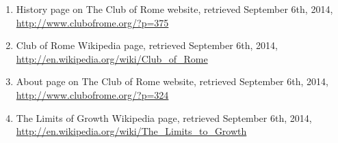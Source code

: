 \documentclass[10pt,a4paper]{article}
\begin{document}
\begin{enumerate}
\item History page on The Club of Rome website, retrieved September 6th, 2014, \url{http://www.clubofrome.org/?p=375}
\item Club of Rome Wikipedia page, retrieved September 6th, 2014, \url{http://en.wikipedia.org/wiki/Club_of_Rome}
\item About page on The Club of Rome website, retrieved September 6th, 2014, \url{http://www.clubofrome.org/?p=324}
\item The Limits of Growth Wikipedia page, retrieved September 6th, 2014, \url{http://en.wikipedia.org/wiki/The_Limits_to_Growth}
\end{enumerate}
\end{document}
